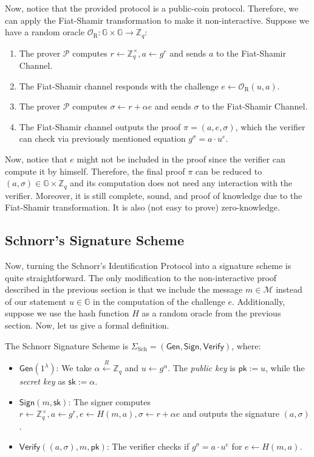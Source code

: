 \documentclass[../lecture-notes.tex]{subfiles}
\begin{document}
Now, notice that the provided protocol is a public-coin protocol. Therefore, we can apply the Fiat-Shamir transformation to make it non-interactive. Suppose we have a random oracle $\mathcal{O}_{\text{R}}: \mathbb{G} \times \mathbb{G} \to \mathbb{Z}_q$:
\begin{enumerate}
    \item The prover $\mathcal{P}$ computes $r \gets \mathbb{Z}_q^{\times}, a \gets g^{r}$ and sends $a$ to the Fiat-Shamir Channel.
    \item The Fiat-Shamir channel responds with the challenge $e \gets \mathcal{O}_{\text{R}}(u,a)$.
    \item The prover $\mathcal{P}$ computes $\sigma \gets r + \alpha e$ and sends $\sigma$ to the Fiat-Shamir Channel.
    \item The Fiat-Shamir channel outputs the proof $\pi = (a,e,\sigma)$, which the verifier can check via previously mentioned equation $g^{\sigma} = a \cdot u^e$.
\end{enumerate}

Now, notice that $e$ might not be included in the proof since the verifier can compute it by himself. Therefore, the final proof $\pi$ can be reduced to $(a,\sigma) \in \mathbb{G} \times \mathbb{Z}_q$ and its computation does not need any interaction with the verifier. Moreover, it is still complete, sound, and proof of knowledge due to the Fiat-Shamir transformation. It is also (not easy to prove) zero-knowledge.

\subsection{Schnorr's Signature Scheme}

Now, turning the Schnorr's Identification Protocol into a signature scheme is quite straightforward. The only modification to the non-interactive proof described in the previous section is that we include the message $m \in \mathcal{M}$ instead of our statement $u \in \mathbb{G}$ in the computation of the challenge $e$. Additionally, suppose we use the hash function $H$ as a random oracle from the previous section. Now, let us give a formal definition.

\begin{definition}
    The Schnorr Signature Scheme is $\Sigma_{\text{Sch}} = (\mathsf{Gen}, \mathsf{Sign}, \mathsf{Verify})$, where:
    \begin{itemize}
        \item $\mathsf{Gen}(1^{\lambda})$: We take $\alpha \xleftarrow{R} \mathbb{Z}_q$ and $u \gets g^{\alpha}$. The \textit{public key} is $\mathsf{pk} := u$, while the \textit{secret key} as $\mathsf{sk} := \alpha$.
        \item $\mathsf{Sign}(m,\mathsf{sk})$: The signer computes $r \gets \mathbb{Z}_q^{\times}, a \gets g^{r}, e \gets H(m, a), \sigma \gets r + \alpha e$ and outputs the signature $(a,\sigma)$.
        \item $\mathsf{Verify}((a, \sigma), m,\mathsf{pk})$: The verifier checks if $g^{\sigma} = a \cdot u^e$ for $e \gets H(m, a)$.
    \end{itemize}
\end{definition}
\end{document}
